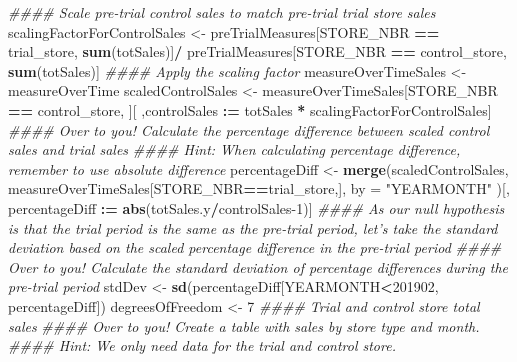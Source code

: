 \documentclass[]{article}
\newenvironment{Shaded}{\begin{snugshade}}{\end{snugshade}}
\newcommand{\CommentTok}[1]{\textcolor[rgb]{0.56,0.35,0.01}{\textit{#1}}}
\newcommand{\DataTypeTok}[1]{\textcolor[rgb]{0.13,0.29,0.53}{#1}}
\newcommand{\DecValTok}[1]{\textcolor[rgb]{0.00,0.00,0.81}{#1}}
\newcommand{\ErrorTok}[1]{\textcolor[rgb]{0.64,0.00,0.00}{\textbf{#1}}}
\newcommand{\KeywordTok}[1]{\textcolor[rgb]{0.13,0.29,0.53}{\textbf{#1}}}
\newcommand{\NormalTok}[1]{#1}
\newcommand{\OperatorTok}[1]{\textcolor[rgb]{0.81,0.36,0.00}{\textbf{#1}}}
\newcommand{\StringTok}[1]{\textcolor[rgb]{0.31,0.60,0.02}{#1}}
\begin{document}
\begin{Shaded}
\begin{Highlighting}[]
\CommentTok{#### Scale pre-trial control sales to match pre-trial trial store sales}
\NormalTok{scalingFactorForControlSales <-}\StringTok{ }\NormalTok{preTrialMeasures[STORE_NBR }\OperatorTok{==}\StringTok{ }\NormalTok{trial_store, }\KeywordTok{sum}\NormalTok{(totSales)]}\OperatorTok{/}
\StringTok{                                }\NormalTok{preTrialMeasures[STORE_NBR }\OperatorTok{==}\StringTok{ }\NormalTok{control_store, }\KeywordTok{sum}\NormalTok{(totSales)]}
\CommentTok{#### Apply the scaling factor}
\NormalTok{measureOverTimeSales <-}\StringTok{ }\NormalTok{measureOverTime}
\NormalTok{scaledControlSales <-}\StringTok{ }\NormalTok{measureOverTimeSales[STORE_NBR }\OperatorTok{==}\StringTok{ }\NormalTok{control_store, }
\NormalTok{                                           ][ ,controlSales }\OperatorTok{:}\ErrorTok{=}\StringTok{ }\NormalTok{totSales }\OperatorTok{*}
\StringTok{                                                }\NormalTok{scalingFactorForControlSales]}
\CommentTok{#### Over to you! Calculate the percentage difference between scaled control sales and trial sales}
\CommentTok{#### Hint: When calculating percentage difference, remember to use absolute difference}
\NormalTok{percentageDiff <-}\StringTok{ }\KeywordTok{merge}\NormalTok{(scaledControlSales, }
\NormalTok{                        measureOverTimeSales[STORE_NBR}\OperatorTok{==}\NormalTok{trial_store,],}
                        \DataTypeTok{by =} \StringTok{"YEARMONTH"}
\NormalTok{                        )[, percentageDiff }\OperatorTok{:}\ErrorTok{=}\StringTok{ }\KeywordTok{abs}\NormalTok{(totSales.y}\OperatorTok{/}\NormalTok{controlSales}\DecValTok{-1}\NormalTok{)]}
\CommentTok{#### As our null hypothesis is that the trial period is the same as the pre-trial period, let's take the standard deviation based on the scaled percentage difference in the pre-trial period}
\CommentTok{#### Over to you! Calculate the standard deviation of percentage differences during the pre-trial period}
\NormalTok{stdDev <-}\StringTok{ }\KeywordTok{sd}\NormalTok{(percentageDiff[YEARMONTH}\OperatorTok{<}\DecValTok{201902}\NormalTok{, percentageDiff])}
\NormalTok{degreesOfFreedom <-}\StringTok{ }\DecValTok{7}
\CommentTok{#### Trial and control store total sales}
\CommentTok{#### Over to you! Create a table with sales by store type and month.}
\CommentTok{#### Hint: We only need data for the trial and control store.}


\end{Highlighting}
\end{Shaded}
\end{document}
